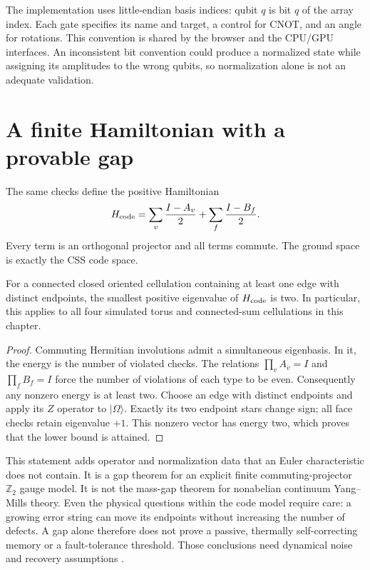 The implementation uses little-endian basis indices: qubit $q$ is bit $q$
of the array index.  Each gate specifies its name and target, a control for
CNOT, and an angle for rotations.  This convention is shared by the
browser and the CPU/GPU interfaces.  An inconsistent bit convention could
produce a normalized state while assigning its amplitudes to the wrong
qubits, so normalization alone is not an adequate validation.

\section{A finite Hamiltonian with a provable gap}

The same checks define the positive Hamiltonian
\[
 H_{\rm code}=\sum_v\frac{I-A_v}{2}
              +\sum_f\frac{I-B_f}{2}.
\]
Every term is an orthogonal projector and all terms commute.  The ground
space is exactly the CSS code space.

\begin{proposition}
For a connected closed oriented cellulation containing at least one edge
with distinct endpoints, the smallest positive eigenvalue of $H_{\rm code}$
is two. In particular, this applies to all four simulated torus and
connected-sum cellulations in this chapter.
\end{proposition}
\begin{proof}
Commuting Hermitian involutions admit a simultaneous eigenbasis.  In it,
the energy is the number of violated checks.  The relations
$\prod_vA_v=I$ and $\prod_fB_f=I$ force the number of violations of
each type to be even.  Consequently any nonzero energy is at least two.
Choose an edge with distinct endpoints and apply its $Z$ operator to
$|\Omega\rangle$.  Exactly its two endpoint stars change sign; all face
checks retain eigenvalue $+1$.  This nonzero vector has energy two,
which proves that the lower bound is attained.
\end{proof}

This statement adds operator and normalization data that an Euler
characteristic does not contain.  It is a gap theorem for an explicit
finite commuting-projector $\mathbb Z_2$ gauge model.  It is not the
mass-gap theorem for nonabelian continuum Yang--Mills theory.  Even the
physical questions within the code model require care: a growing error
string can move its endpoints without increasing the number of defects.
A gap alone therefore does not prove a passive, thermally self-correcting
memory or a fault-tolerance threshold.  Those conclusions need dynamical
noise and recovery assumptions \cite{QSDennis2002}.

